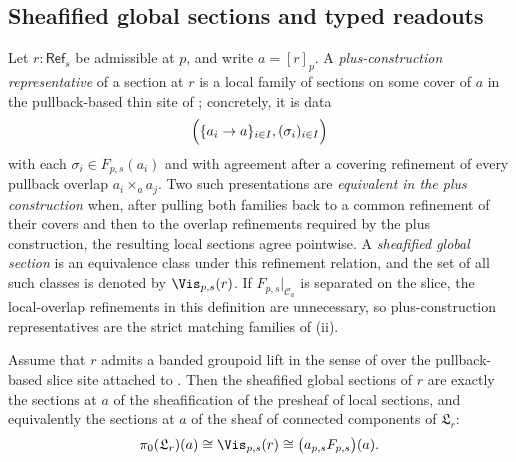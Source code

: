 \subsection{Sheafified global sections and typed readouts}

\begin{definition}\label{def:visible-value-classes}
Let $r:\mathsf{Ref}_s$ be admissible at $p$, and write $a=[r]_p$. A \emph{plus-construction representative} of a section at $r$ is a local family of sections on some cover of $a$ in the pullback-based thin site of ; concretely, it is data
\[
\Bigl(\{a_i\to a\}_{i\in I},(\sigma_i)_{i\in I}\Bigr)
\]
with each $\sigma_i\in F_{p,s}(a_i)$ and with agreement after a covering
refinement of every pullback overlap $a_i\times_a a_j$. Two such
presentations are \emph{equivalent in the plus construction} when, after pulling both
families back to a common refinement of their covers and then to the
overlap refinements required by the plus construction, the resulting
local sections agree pointwise. A \emph{sheafified global section} is an
equivalence class under this refinement relation, and the set of all such
classes is denoted by $\Vis_{p,s}(r)$. If
$F_{p,s}|_{\mathcal C_a}$ is separated on the slice, the local-overlap
refinements in this definition are unnecessary, so plus-construction representatives
are the strict matching families of (ii).
\end{definition}


\begin{proposition}\label{thm:visible-value-components}
Assume that $r$ admits a banded groupoid lift in the sense of  over the pullback-based slice site attached to . Then the sheafified global sections of $r$ are exactly the sections at $a$ of the sheafification of the presheaf of local sections, and equivalently the sections at $a$ of the sheaf of connected components of $\mathfrak L_r$:
\[
\pi_0(\mathfrak L_r)(a)\cong \Vis_{p,s}(r)\cong \bigl(a_{p,s}F_{p,s}\bigr)(a).
\]
\end{proposition}


